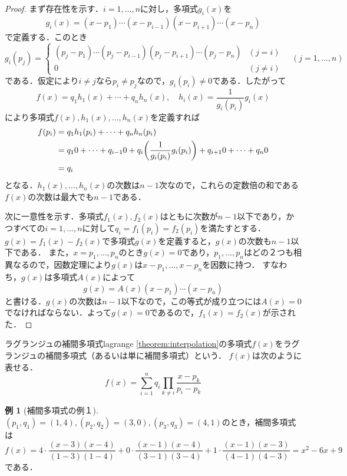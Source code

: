 \documentclass[a4paper]{ltjsarticle}
\theoremstyle{definition}
\newtheorem{example}{例}[section]
\DeclarePairedDelimiter{\pqty}{\lparen}{\rparen}
\begin{document}
\begin{proof}
  まず存在性を示す．$i=1,\dots,n$に対し，多項式$g_i(x)$を
  \[
    g_i(x) = (x-p_1) \cdots (x-p_{i-1})(x-p_{i+1}) \cdots (x-p_n)
  \]
  で定義する．このとき
  \[
    g_i(p_j) = {
      \begin{cases}
        (p_j-p_1) \cdots (p_j-p_{i-1})(p_j-p_{i+1}) \cdots (p_j-p_n) & (j = i) \\
        0 & (j \neq i)
      \end{cases}
      \quad
      (j = 1,\dots,n)
    }
  \]
  である．仮定により$i \neq j$なら$p_i \neq p_j$なので，$g_i (p_i) \neq 0$である．したがって
  \[
    f(x) = q_1h_1(x) + \cdots + q_nh_n(x),
    \quad
    h_i(x) = \frac{1}{g_i(p_i)} g_i(x)
  \]
  により多項式$f(x), h_1(x), \dots, h_n(x)$を定義すれば
  \begin{align*}
    f(p_i)
    &= q_1h_1(p_i) + \cdots + q_nh_n(p_i) \\
    &= q_10 + \cdots + q_{i-1}0 + q_i\pqty*{\frac{1}{g_i(p_i)} g_i(p_i)} + q_{i+1}0 + \cdots + q_n0 \\
    &= q_i
  \end{align*}
  となる．$h_1(x), \dots, h_n(x)$の次数は$n-1$次なので，これらの定数倍の和である$f(x)$の次数は最大でも$n-1$である．

  次に一意性を示す．多項式$f_1(x), f_2(x)$はともに次数が$n-1$以下であり，かつすべての$i = 1, \dots, n$に対して$q_i = f_1(p_i) = f_2(p_i)$を満たすとする．
  $g(x) = f_1(x) - f_2(x)$で多項式$g(x)$を定義すると，$g(x)$の次数も$n-1$以下である．
  また，$x = p_1, \dots, p_n$のとき$g(x) = 0$であり，$p_1,\dots,p_n$はどの２つも相異なるので，因数定理により$g(x)$は$x-p_1,\dots,x-p_n$を因数に持つ．
  すなわち，$g(x)$は多項式$A(x)$によって
  \[
    g(x) = A(x)(x-p_1) \cdots (x-p_n)
  \]
  と書ける．$g(x)$の次数は$n-1$以下なので，この等式が成り立つには$A(x) = 0$でなければならない．よって$g(x) = 0$であるので，$f_1(x) = f_2(x)$が示された．
\end{proof}

\begin{definition}{ラグランジュの補間多項式}{lagrange}
  \cref{theorem:interpolation}の多項式$f(x)$をラグランジュの補間多項式（あるいは単に補間多項式）という．
  $f(x)$は次のように表せる{\footnotemark}．
  \[
    f(x) = \sum_{i=1}^n q_i \prod_{k\neq i} \frac{x - p_k}{p_i - p_k}
  \]
\end{definition}

\begin{example}[補間多項式の例１]
  \label{example:lagrange_1}
  $(p_1,q_1)=(1,4),(p_2,q_2)=(3,0),(p_3,q_3)=(4,1)$のとき，補間多項式は
  \[
    f(x)
    = 4\cdot\frac{(x-3)(x-4)}{(1-3)(1-4)} + 0\cdot\frac{(x-1)(x-4)}{(3-1)(3-4)} + 1\cdot\frac{(x-1)(x-3)}{(4-1)(4-3)}
    = x^2-6x+9
  \]
  である．
\end{example}
\end{document}
